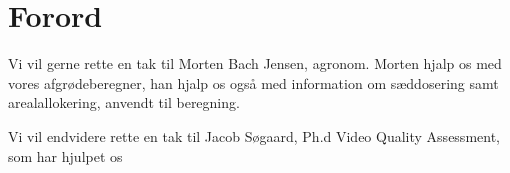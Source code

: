 \section{Forord}
Vi vil gerne rette en tak til Morten Bach Jensen, agronom. Morten hjalp os med vores afgrødeberegner, han hjalp os også med information om sæddosering samt arealallokering, anvendt til beregning.

Vi vil endvidere rette en tak til Jacob Søgaard, Ph.d Video Quality Assessment, som har hjulpet os 